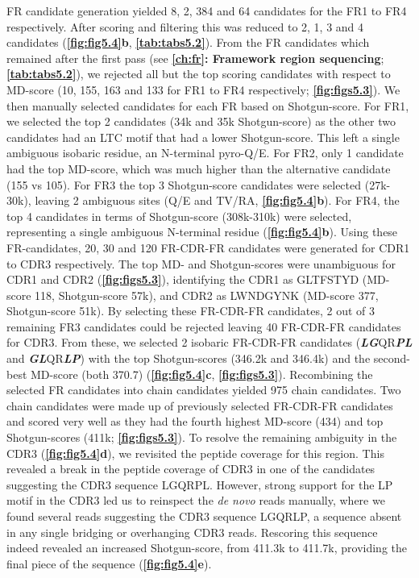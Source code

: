 FR candidate generation yielded 8, 2, 384 and 64 candidates for the FR1 to FR4 respectively. After scoring and filtering this was reduced to 2, 1, 3 and 4 candidates (\textbf{\autoref{fig:fig5.4}b}, \textbf{\autoref{tab:tabs5.2}}). From the FR candidates which remained after the first pass (see \textbf{\autoref{ch:fr}: Framework region sequencing}; \textbf{\autoref{tab:tabs5.2}}), we rejected all but the top scoring candidates with respect to MD-score (10, 155, 163 and 133 for FR1 to FR4 respectively; \textbf{\autoref{fig:figs5.3}}). We then manually selected candidates for each FR based on Shotgun-score. For FR1, we selected the top 2 candidates (34k and 35k Shotgun-score) as the other two candidates had an LTC motif that had a lower Shotgun-score. This left a single ambiguous isobaric residue, an N-terminal pyro-Q/E. For FR2, only 1 candidate had the top MD-score, which was much higher than the alternative candidate (155 vs 105). For FR3 the top 3 Shotgun-score candidates were selected (27k-30k), leaving 2 ambiguous sites (Q/E and TV/RA, \textbf{\autoref{fig:fig5.4}b}). For FR4, the top 4 candidates in terms of Shotgun-score (308k-310k) were selected, representing a single ambiguous N-terminal residue (\textbf{\autoref{fig:fig5.4}b}).
Using these FR-candidates, 20, 30 and 120 FR-CDR-FR candidates were generated for CDR1 to CDR3 respectively. The top MD- and Shotgun-scores were unambiguous for CDR1 and CDR2 (\textbf{\autoref{fig:figs5.3}}), identifying the CDR1 as GLTFSTYD (MD-score 118, Shotgun-score 57k), and CDR2 as LWNDGYNK (MD-score 377, Shotgun-score 51k). By selecting these FR-CDR-FR candidates, 2 out of 3 remaining FR3 candidates could be rejected leaving 40 FR-CDR-FR candidates for CDR3. From these, we selected 2 isobaric FR-CDR-FR candidates (\textbf{\emph{LG}}QR\textbf{\emph{PL}} and \textbf{\emph{GL}}QR\textbf{\emph{LP}}) with the top Shotgun-scores (346.2k and 346.4k) and the second-best MD-score (both 370.7) (\textbf{\autoref{fig:fig5.4}c}, \textbf{\autoref{fig:figs5.3}}).
Recombining the selected FR candidates into chain candidates yielded 975 chain candidates. Two chain candidates were made up of previously selected FR-CDR-FR candidates and scored very well as they had the fourth highest MD-score (434) and top Shotgun-scores (411k; \textbf{\autoref{fig:figs5.3}}). To resolve the remaining ambiguity in the CDR3 (\textbf{\autoref{fig:fig5.4}d}), we revisited the peptide coverage for this region. This revealed a break in the peptide coverage of CDR3 in one of the candidates suggesting the CDR3 sequence LGQRPL. However, strong support for the LP motif in the CDR3 led us to reinspect the \emph{de novo} reads manually, where we found several reads suggesting the CDR3 sequence LGQRLP, a sequence absent in any single bridging or overhanging CDR3 reads. Rescoring this sequence indeed revealed an increased Shotgun-score, from 411.3k to 411.7k, providing the final piece of the sequence (\textbf{\autoref{fig:fig5.4}e}).



